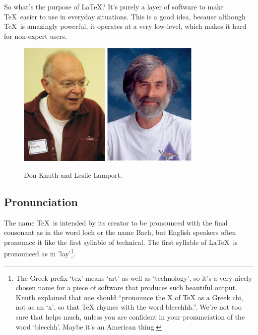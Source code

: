 \begin{refsection}
  
So what's the purpose of \LaTeX ? It's purely a layer of software to make \TeX\ easier to use in everyday situations. This is a good idea, because although \TeX\ is amazingly powerful, it operates at a very low-level, which makes it hard for non-expert users.

\begin{figure}[hb]
  \centering
     \includegraphics[height=6cm]{images/knuth.png}
\quad\quad  \includegraphics[height=6cm]{images/lamport.png}
\caption{Don Knuth and Leslie Lamport.}\label{figure:knuthlamport}
\end{figure}

\subsection{Pronunciation}
\label{sec:pronunciation}
  The name \TeX\ is intended by its creator to be pronounced with the final consonant as in the word loch or the name Bach, but English speakers often pronounce it like the first syllable of technical. The first syllable of \LaTeX\ is pronounced as in 'lay'\footnote{The Greek prefix `tex' means `art' as well as `technology', so it's a very nicely chosen name for a piece of software that produces such beautiful output. Knuth explained \citep{knuth1984} that one should ``pronounce the X of TeX as a Greek chi, not as an `x', so that TeX rhymes with the word blecchhh.''. We're not too sure that helps much, unless you are confident in your pronunciation of the word `blecchh'. Maybe it's an American thing.}.



\end{refsection}
